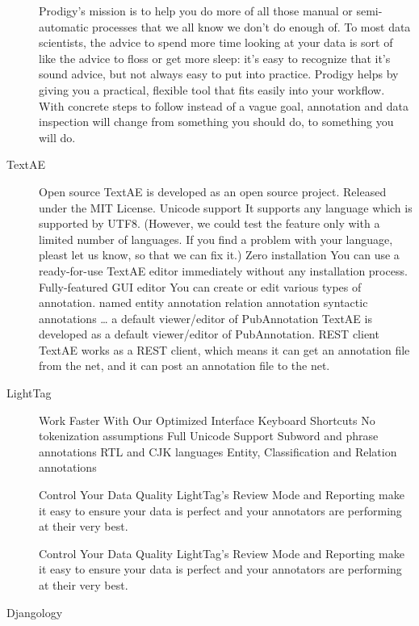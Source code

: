 \begin{description}
    Prodigy’s mission is to help you do more of all those manual or semi-automatic processes that we all know we don’t do enough of. To most data scientists, the advice to spend more time looking at your data is sort of like the advice to floss or get more sleep: it’s easy to recognize that it’s sound advice, but not always easy to put into practice. Prodigy helps by giving you a practical, flexible tool that fits easily into your workflow. With concrete steps to follow instead of a vague goal, annotation and data inspection will change from something you should do, to something you will do.

    \item[TextAE]

    Open source
    TextAE is developed as an open source project.
    Released under the MIT License.
     Unicode support
    It supports any language which is supported by UTF8.
    (However, we could test the feature only with a limited number of languages. If you find a problem with your language, pleast let us know, so that we can fix it.)
     Zero installation
    You can use a ready-for-use TextAE editor immediately without any installation process.
     Fully-featured GUI editor
    You can create or edit various types of annotation.
    named entity annotation
    relation annotation
    syntactic annotations
    …
     a default viewer/editor of PubAnnotation
    TextAE is developed as a default viewer/editor of PubAnnotation.
     REST client
    TextAE works as a REST client, which means
    it can get an annotation file from the net, and
    it can post an annotation file to the net.

    \item[LightTag]

    Work Faster With Our Optimized Interface
Keyboard Shortcuts
No tokenization assumptions
Full Unicode Support
Subword and phrase annotations
RTL and CJK languages
Entity, Classification and Relation annotations

Control Your Data Quality
LightTag's Review Mode and Reporting make it easy to ensure your data is perfect and your annotators are performing at their very best.

Control Your Data Quality
LightTag's Review Mode and Reporting make it easy to ensure your data is perfect and your annotators are performing at their very best.

    \item[Djangology]


\end{description}
